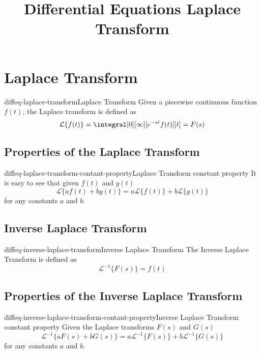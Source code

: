 \documentclass[preview]{standalone}
\begin{document}
\title{Differential Equations Laplace Transform}
\genpage

\section{Laplace Transform}

\begin{snippetdefinition}{diffeq-laplace-transform}{Laplace Transform}
    Given a piecewise continuous function \(f(t)\), the Laplace transform
    is defined as
    \[
        \mathcal{L}\{f(t)\}= \integral[0][\infty][e^{-st}f(t)][t]=F(s)
    \]
\end{snippetdefinition}

\subsection{Properties of the Laplace Transform}

\begin{snippetcorollary}{diffeq-laplace-transform-contant-property}{Laplace Transform constant property}
    It is easy to see that given \(f(t)\) and \(g(t)\)
    \[
        \mathcal{L}\{af(t)+bg(t)\} = a\mathcal{L}\{f(t)\} + b\mathcal{L}\{g(t)\}
    \]
    for any constants \(a\) and \(b\).
\end{snippetcorollary}

\subsection{Inverse Laplace Transform}

\begin{snippetdefinition}{diffeq-inverse-laplace-transform}{Inverse Laplace Transform}
    The Inverse Laplace Transform is defined as
    \[
        {\mathcal{L}}^{-1} \{F(s)\}= f(t)
    \]
\end{snippetdefinition}

\subsection{Properties of the Inverse Laplace Transform}

\begin{snippetcorollary}{diffeq-inverse-laplace-transform-contant-property}{Inverse Laplace Transform constant property}
    Given the Laplace transforms \(F(s)\) and \(G(s)\)
    \[
        {\mathcal{L}}^{-1} \{aF(s)+bG(s)\} =
        a{\mathcal{L}}^{-1}\{F(s)\} +
        b{\mathcal{L}}^{-1}\{G(s)\}
    \]
    for any constants \(a\) and \(b\).
\end{snippetcorollary}
\end{document}
